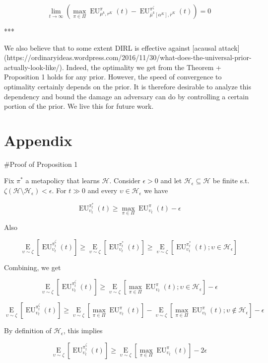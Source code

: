 \documentclass[a4paper]{article}
\newcommand{\E}[1]{\underset{#1}{\operatorname{E}}}
\newcommand{\Hy}{\mathcal{H}}
\newcommand{\EU}{\operatorname{EU}}
\begin{document}
$$\lim_{t \rightarrow \infty} (\max_{\pi \in \Pi} \EU_{\mu^k,r^K}^\pi(t) - \EU_{\bar{\mu}^k[\alpha^K],\bar{r}^K}^{\pi^\zeta}(t)) = 0$$

***

We also believe that to some extent DIRL is effective against [acausal attack](https://ordinaryideas.wordpress.com/2016/11/30/what-does-the-universal-prior-actually-look-like/). Indeed, the optimality we get from the Theorem + Proposition 1 holds for any prior. However, the speed of convergence to optimality certainly depends on the prior.  It is therefore desirable to analyze this dependency and bound the damage an adversary can do by controlling a certain portion of the prior. We live this for future work.

\section{Appendix}

\#Proof of Proposition 1

Fix $\pi^*$ a metapolicy that learns $\Hy$. Consider $\epsilon > 0$ and let $\Hy_\epsilon \subseteq \Hy$ be finite s.t. $\zeta(\Hy \setminus \Hy_\epsilon) < \epsilon$. For $t \gg 0$ and every $\upsilon \in \Hy_\epsilon$ we have

$$\EU_{\upsilon_t}^{\pi^*_t}(t) \geq \max_{\pi \in \Pi} \EU_{\upsilon_t}^{\pi}(t) - \epsilon$$

Also

$$\E{\upsilon \sim \zeta}[\EU_{\upsilon_t}^{\pi^\zeta_t}(t)] \geq \E{\upsilon \sim \zeta}[\EU_{\upsilon_t}^{\pi^*_t}(t)] \geq \E{\upsilon \sim \zeta}[\EU_{\upsilon_t}^{\pi^*_t}(t); \upsilon \in \Hy_\epsilon]$$

Combining, we get

$$\E{\upsilon \sim \zeta}[\EU_{\upsilon_t}^{\pi^\zeta_t}(t)] \geq \E{\upsilon \sim \zeta}[\max_{\pi \in \Pi} \EU_{\upsilon_t}^{\pi}(t); \upsilon \in \Hy_\epsilon] - \epsilon$$

$$\E{\upsilon \sim \zeta}[\EU_{\upsilon_t}^{\pi^\zeta_t}(t)] \geq \E{\upsilon \sim \zeta}[\max_{\pi \in \Pi} \EU_{\upsilon_t}^{\pi}(t)] -  \E{\upsilon \sim \zeta}[\max_{\pi \in \Pi} \EU_{\upsilon_t}^{\pi}(t); \upsilon \not\in \Hy_\epsilon] - \epsilon$$

By definition of $\Hy_\epsilon$, this implies

$$\E{\upsilon \sim \zeta}[\EU_{\upsilon_t}^{\pi^\zeta_t}(t)] \geq \E{\upsilon \sim \zeta}[\max_{\pi \in \Pi} \EU_{\upsilon_t}^{\pi}(t)] -  2\epsilon$$
\end{document}
